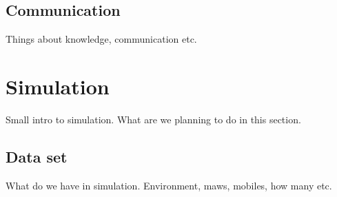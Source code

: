 \documentclass[conference]{IEEEtran}
\begin{document}







\subsection{Communication}
Things about knowledge, communication etc.







\section{Simulation}
Small intro to simulation. What are we planning to do in this section.









\subsection{Data set}
What do we have in simulation. Environment, maws, mobiles, how many etc.








\end{document}

